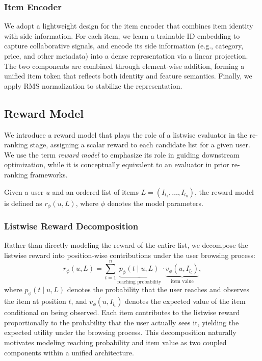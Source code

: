 \documentclass[sigconf]{acmart}
\begin{document}
\subsubsection{Item Encoder}
We adopt a lightweight design for the item encoder that combines item identity with side information. For each item, we learn a trainable ID embedding to capture collaborative signals, and encode its side information (e.g., category, price, and other metadata) into a dense representation via a linear projection. The two components are combined through element-wise addition, forming a unified item token that reflects both identity and feature semantics. Finally, we apply RMS normalization to stabilize the representation.

\subsection{Reward Model}
We introduce a reward model that plays the role of a listwise evaluator in the re-ranking stage, assigning a scalar reward to each candidate list for a given user. We use the term \emph{reward model} to emphasize its role in guiding downstream optimization, while it is conceptually equivalent to an evaluator in prior re-ranking frameworks.
 
Given a user $u$ and an ordered list of items $L = (I_{l_1}, \ldots, I_{l_n})$, the reward model is defined as $r_\phi(u, L)$, where $\phi$ denotes the model parameters.

\subsubsection{Listwise Reward Decomposition}
Rather than directly modeling the reward of the entire list, we decompose the listwise reward into position-wise contributions under the user browsing process:
\begin{equation}
\label{eq:reward_decomposition}
    r_\phi(u, L) = \sum_{t=1}^{n} \underbrace{p_\phi(t \mid u, L)}_{\text{reaching probability}} \cdot \underbrace{v_\phi(u, I_{l_t})}_{\text{item value}},
\end{equation}
where $p_\phi(t \mid u, L)$ denotes the probability that the user reaches and observes the item at position $t$, and $v_\phi(u, I_{l_t})$ denotes the expected value of the item conditional on being observed. Each item contributes to the listwise reward proportionally to the probability that the user actually sees it, yielding the expected utility under the browsing process. This decomposition naturally motivates modeling reaching probability and item value as two coupled components within a unified architecture.
\end{document}
